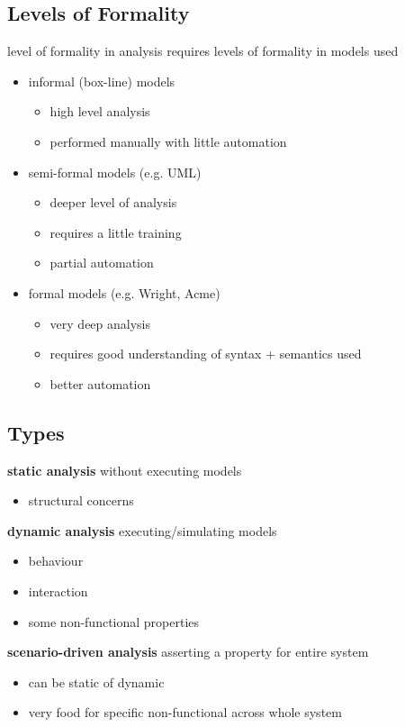 \documentclass[]{article}
\theoremstyle{definition}
\begin{document}
	\subsection{Levels of Formality}
	level of formality in analysis requires levels of formality in models used
	\begin{itemize}
		\item informal (box-line) models
			\begin{itemize}
				\item high level analysis 
				\item performed manually with little automation
			\end{itemize}
		\item semi-formal models (e.g. UML)
			\begin{itemize}
				\item deeper level of analysis
				\item requires a little training 
				\item partial automation
			\end{itemize}
		\item formal models (e.g. Wright, Acme)
			\begin{itemize}
				\item very deep analysis
				\item requires good understanding of syntax + semantics used
				\item better automation
			\end{itemize}
	\end{itemize}

	\subsection{Types}
	\textbf{static analysis} without executing models
	\begin{itemize}
		\item structural concerns
	\end{itemize}
	\textbf{dynamic analysis} executing/simulating models
	\begin{itemize}
		\item behaviour
		\item interaction
		\item some non-functional properties
	\end{itemize}
	\textbf{scenario-driven analysis} asserting a property for entire system 
	\begin{itemize}
		\item can be static of dynamic
		\item very food for specific non-functional across whole system
	\end{itemize}
	
\end{document}
